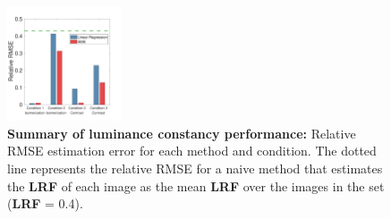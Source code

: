 \documentclass{jov}
\providecommand{\DIFaddtex}[1]{{\bf #1}} %
\providecommand{\DIFdeltex}[1]{} %
\providecommand{\DIFaddFL}[1]{\DIFadd{#1}} %
\providecommand{\DIFdelFL}[1]{\DIFdel{#1}} %
\providecommand{\DIFaddbeginFL}{} %
\providecommand{\DIFaddendFL}{} %
\providecommand{\DIFdelbeginFL}{} %
\providecommand{\DIFdelendFL}{} %
\providecommand{\DIFadd}[1]{\texorpdfstring{\DIFaddtex{#1}}{#1}} %
\providecommand{\DIFdel}[1]{\texorpdfstring{\DIFdeltex{#1}}{}} %
\newcommand{\DIFscaledelfig}{0.5}
\newlength{\DIFdelgraphicswidth} %
\newlength{\DIFdelgraphicsheight} %
\newcommand{\DIFaddincludegraphics}[2][]{{\color{blue}\fbox{\DIFOincludegraphics[#1]{#2}}}} %
\newcommand{\DIFdelincludegraphics}[2][]{%
\sbox{\DIFdelgraphicsbox}{\DIFOincludegraphics[#1]{#2}}%
\settoboxwidth{\DIFdelgraphicswidth}{\DIFdelgraphicsbox} %
\settoboxtotalheight{\DIFdelgraphicsheight}{\DIFdelgraphicsbox} %
\scalebox{\DIFscaledelfig}{%
\parbox[b]{\DIFdelgraphicswidth}{\usebox{\DIFdelgraphicsbox}\\[-\baselineskip] \rule{\DIFdelgraphicswidth}{0em}}\llap{\resizebox{\DIFdelgraphicswidth}{\DIFdelgraphicsheight}{%
\setlength{\unitlength}{\DIFdelgraphicswidth}%
\begin{picture}(1,1)%
\thicklines\linethickness{2pt} %
{\color[rgb]{1,0,0}\put(0,0){\framebox(1,1){}}}%
{\color[rgb]{1,0,0}\put(0,0){\line( 1,1){1}}}%
{\color[rgb]{1,0,0}\put(0,1){\line(1,-1){1}}}%
\end{picture}%
}\hspace*{3pt}}} %
} %
\DeclareRobustCommand{\DIFaddbeginFL}{\DIFOaddbeginFL \let\includegraphics\DIFaddincludegraphics} %
\DeclareRobustCommand{\DIFaddendFL}{\DIFOaddendFL \let\includegraphics\DIFOincludegraphics} %
\DeclareRobustCommand{\DIFdelbeginFL}{\DIFOdelbeginFL \let\includegraphics\DIFdelincludegraphics} %
\DeclareRobustCommand{\DIFdelendFL}{\DIFOaddendFL \let\includegraphics\DIFOincludegraphics} %
\begin{document}
\begin{figure}
\centering
\includegraphics[width=0.3\textwidth]{../FiguresDraft5/Figure14/Figure14.pdf}
\caption{{\bf Summary of luminance constancy performance:} Relative RMSE estimation error for each method and condition. \DIFdelbeginFL \DIFdelFL{Relative RMSE is the square root of the mean of the squared difference between the estimated and true LRV divided by the true LRV. }\DIFdelendFL The \DIFdelbeginFL \DIFdelFL{mean is taken over all stimuli in the test set. The }\DIFdelendFL dotted line represents the relative RMSE for a naive method that estimates the \DIFdelbeginFL \DIFdelFL{LRV }\DIFdelendFL \DIFaddbeginFL \DIFaddFL{LRF }\DIFaddendFL of each image as the mean \DIFdelbeginFL \DIFdelFL{LRV }\DIFdelendFL \DIFaddbeginFL \DIFaddFL{LRF }\DIFaddendFL over the images in the set (\DIFdelbeginFL \DIFdelFL{LRV }\DIFdelendFL \DIFaddbeginFL \DIFaddFL{LRF }\DIFaddendFL = 0.4).}
 \label{fig:barGraphs}
\end{figure}
\end{document}
